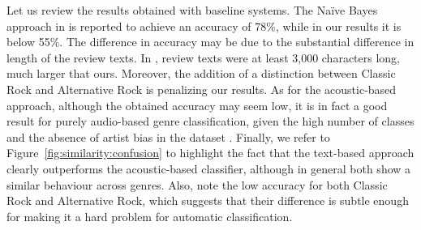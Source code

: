 
Let us review the results obtained with baseline systems. The Na\"{i}ve Bayes approach in \cite{Hu2005} is reported to achieve an accuracy of 78\%, while in our results it is below 55\%. The difference in accuracy may be due to the substantial difference in length of the review texts. In \cite{Hu2005}, review texts were at least 3,000 characters long, much larger that ours. Moreover, the addition of a distinction between Classic Rock and Alternative Rock is penalizing our results. 
As for the acoustic-based approach, although the obtained accuracy may seem low, it is in fact a good result for purely audio-based genre classification, given the high number of classes and the absence of artist bias in the dataset \citep{bogdanov2016cross}.
Finally, we refer to Figure~\ref{fig:similarity:confusion} to highlight the fact that the text-based approach clearly outperforms the acoustic-based classifier, although in general both show a similar behaviour across genres. Also, note the low accuracy for both Classic Rock and Alternative Rock, which suggests that their difference is subtle enough for making it a hard problem for automatic classification.

